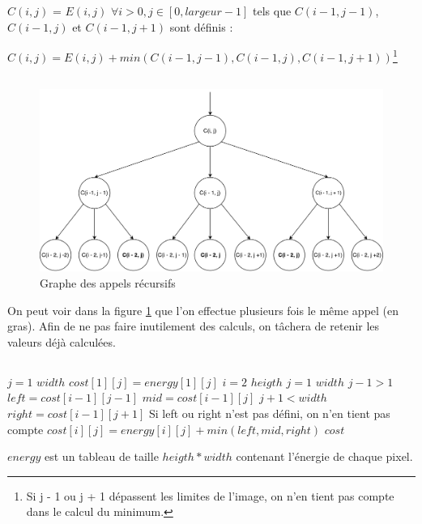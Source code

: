  $C(i, j)$ = $E(i, j)$
\bigbreak
$\forall i > 0, j \in [0, largeur - 1]$ tels que $C(i - 1, j -1)$, $C(i - 1, j)$ et $C(i - 1, j + 1)$ sont définis :

$C(i, j) = E(i, j) + min(C(i - 1, j -1), C(i - 1, j), C(i - 1, j + 1))$\footnote{Si j - 1 ou j + 1 dépassent les limites de l'image, on n'en tient pas compte dans le calcul du minimum.}
\subsection{} %
\begin{figure}[H]
	\centering
	\includegraphics[width=1\linewidth]{cost.pdf}
	\caption{Graphe des appels récursifs}
	\label{cost}
\end{figure}

On peut voir dans la figure \ref{cost} que l'on effectue plusieurs fois le même appel (en gras). Afin de ne pas faire inutilement des calculs, on tâchera de retenir les valeurs déjà calculées.

\subsection{} %
\begin{codebox}
\li \For $j = 1$ \To $width$
\Do
\li 	$cost[1][j] = energy[1][j]$
\End
\li \For $i = 2$ \To $heigth$
\Do 
\li 	\For $j = 1$ \To $width$
 		\Do
\li 		\If $j - 1> 1$
			\Do 
\li 			$left = cost[i - 1][j - 1]$
\End
\li 		$mid = cost[i - 1][j]$
\li 		\If $j + 1< width$
			\Do 
\li 			$right = cost[i - 1][j + 1]$
\End
\li \Comment Si left ou right n'est pas défini, on n'en tient pas compte
\li 		$cost[i][j] = energy[i][j] + min(left, mid, right)$
	\End
\End
\li \Return $cost$
\end{codebox}
$energy$ est un tableau de taille $heigth * width$ contenant l'énergie de chaque pixel.

